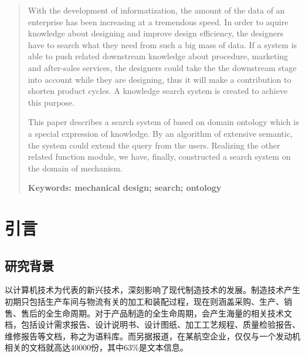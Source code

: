 \documentclass[12pt,a4paper]{article}
\newcommand{\xiaosanhao}{\fontsize{15pt}{\baselineskip}\selectfont}
\newcommand{\xiaosihao}{\fontsize{12pt}{\baselineskip}\selectfont}
\begin{document}
\newpage
\renewcommand\abstractname{\xiaosanhao ABSTRACT}
\begin{abstract}
\setlength{\baselineskip}{20pt} %
\xiaosihao
\Times
With the development of informatization, the amount of the data of an enterprise has been increasing at a tremendous speed. In order to aquire knowledge about designing and improve design efficiency, the designers have to search what they need from such a big mass of data. If a system is able to push related downstream knowledge about procedure, marketing and after-sales services, the designers could take the the downstream stage into account while they are designing, thus it will make a contribution to shorten product cycles. A knowledge search system is created to achieve this purpose.

This paper describes a search system of based on domain ontology which is a special expression of knowledge. By an algorithm of extensive semantic, the system could extend the query from the users. Realizing the other related function module, we have, finally, constructed a search system on the domain of mechanism.  

\vspace{13pt} 

\bfseries{Keywords: }\mdseries mechanical design; search; ontology

\end{abstract}

\newpage

\restoregeometry
\setlength{\parskip}{10pt}
\renewcommand{\contentsname}{目\quad 录}
\tableofcontents



\newpage
\makeatletter %
\setlength{\baselineskip}{20pt} %
\setlength{\parskip}{0pt}
\section{引言} 
	\subsection{研究背景}
	以计算机技术为代表的新兴技术，深刻影响了现代制造技术的发展。制造技术产生初期只包括生产车间与物流有关的加工和装配过程，现在则涵盖采购、生产、销售、售后的全生命周期。对于产品制造的全生命周期，会产生海量的相关技术文档，包括设计需求报告、设计说明书、设计图纸、加工工艺规程、质量检验报告、维修报告等文档，称之为语料库。而另据报道，在某航空企业，仅仅与一个发动机相关的文档就高达40000份，其中63\%是文本信息\cite{1}。 
   
\end{document}
